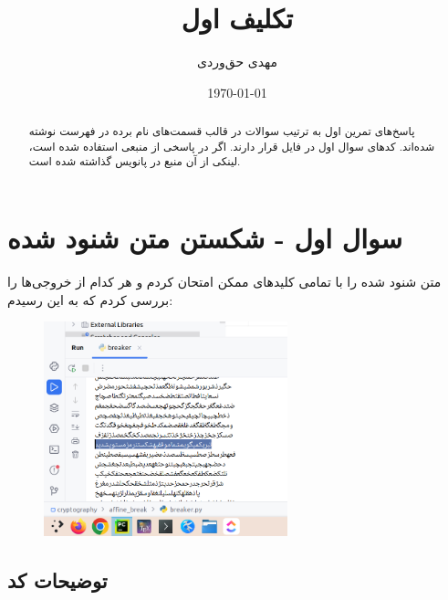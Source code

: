 \documentclass{article}
\title{تکلیف اول}
\author{مهدی حق‌وردی}
\date{\today}
\begin{document}
\maketitle
\tableofcontents

\begin{abstract}
پاسخ‌های تمرین اول به ترتیب سوالات در قالب قسمت‌‌‌‌های نام برده در فهرست نوشته شده‌اند. کدهای سوال اول در فایل  قرار دارند. اگر در پاسخی از منبعی استفاده شده است، لینکی از آن منبع در پانویس گذاشته شده است.
\end{abstract}

\newpage
\section{سوال اول - شکستن متن شنود شده}
متن شنود شده را با تمامی کلید‌‌های ممکن امتحان کردم و هر کدام از خروجی‌ها را بررسی کردم که به این رسیدم:
\begin{figure}[H]
\begin{center}
\includegraphics[width=0.63\textwidth, height=0.4\textheight]{images/found}
\end{center}
\end{figure}

\subsection{توضیحات کد}
\end{document}
